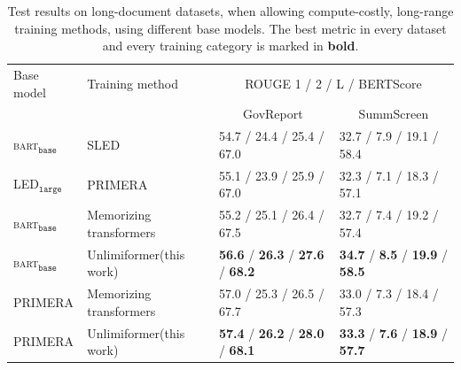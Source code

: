 \documentclass{article}
\newcommand{\ours}{Unlimiformer\xspace}
\begin{document}
\begin{table}[t!]
\centering
\begin{tabular}{llll}
\toprule
Base model & Training method             & \multicolumn{2}{c}{ROUGE 1 / 2 / L / BERTScore} \\ %
& &\multicolumn{1}{c}{GovReport} & \multicolumn{1}{c}{SummScreen} \\
\midrule
\textsc{bart}$_{\texttt{base}}$       & SLED  \citep{sled} & 54.7 / 24.4 / 25.4 / 67.0 & 32.7 / 7.9 / 19.1 / 58.4 \\
 LED$_{\texttt{large}}$    & \textsc{PRIMERA} \citep{xiao-etal-2022-primera}    &  55.1 / 23.9 / 25.9 / 67.0 & 32.3 / 7.1 / 18.3 / 57.1 \\
\textsc{bart}$_{\texttt{base}}$       & Memorizing transformers   & 55.2 / 25.1 / 26.4 / 67.5  & 32.7 / 7.4 / 19.2 / 57.4\\
 \textsc{bart}$_{\texttt{base}}$       & \ours (this work) &  \textbf{56.6} / \textbf{26.3} / \textbf{27.6} / \textbf{68.2} &  \textbf{34.7} /  \textbf{8.5} /  \textbf{19.9} / \textbf{58.5}\\ 
 \midrule
\textsc{PRIMERA}    & Memorizing transformers    &  57.0 / 25.3 / 26.5 / 67.7 & 33.0 / 7.3 / 18.4 / 57.3 \\
\textsc{PRIMERA}    & \ours (this work) & \textbf{57.4} / \textbf{26.2} / \textbf{28.0} / \textbf{68.1} & \textbf{33.3} / \textbf{7.6} / \textbf{18.9} / \textbf{57.7}  \\
\bottomrule
\end{tabular} 

\caption{Test results on long-document datasets, when allowing compute-costly, long-range training methods, using different base models.
The best metric in every dataset and every training category is marked in \textbf{bold}. 
} 
\label{tab:small-datasets-high}
\end{table}
\end{document}
